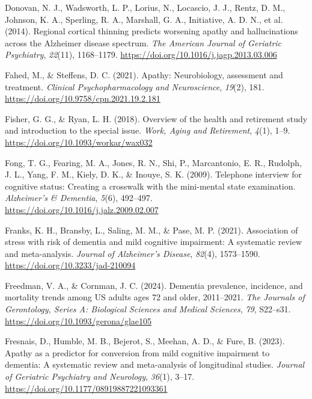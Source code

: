 \documentclass[
]{article}
\newlength{\cslhangindent}
\newenvironment{CSLReferences}[2] %
 {\begin{list}{}{%
  \setlength{\itemindent}{0pt}
  \setlength{\leftmargin}{0pt}
  \setlength{\parsep}{0pt}
  \ifodd #1
   \setlength{\leftmargin}{\cslhangindent}
   \setlength{\itemindent}{-1\cslhangindent}
  \fi
  \setlength{\itemsep}{#2\baselineskip}}}
 {\end{list}}
\begin{document}
\begin{CSLReferences}{1}{0}
Donovan, N. J., Wadsworth, L. P., Lorius, N., Locascio, J. J., Rentz, D.
M., Johnson, K. A., Sperling, R. A., Marshall, G. A., Initiative, A. D.
N., et al. (2014). Regional cortical thinning predicts worsening apathy
and hallucinations across the {Alzheimer} disease spectrum. \emph{The
American Journal of Geriatric Psychiatry}, \emph{22}(11), 1168--1179.
\url{https://doi.org/10.1016/j.jagp.2013.03.006}

Fahed, M., \& Steffens, D. C. (2021). Apathy: Neurobiology, assessment
and treatment. \emph{Clinical Psychopharmacology and Neuroscience},
\emph{19}(2), 181. \url{https://doi.org/10.9758/cpn.2021.19.2.181}

Fisher, G. G., \& Ryan, L. H. (2018). Overview of the health and
retirement study and introduction to the special issue. \emph{Work,
Aging and Retirement}, \emph{4}(1), 1--9.
\url{https://doi.org/10.1093/workar/wax032}

Fong, T. G., Fearing, M. A., Jones, R. N., Shi, P., Marcantonio, E. R.,
Rudolph, J. L., Yang, F. M., Kiely, D. K., \& Inouye, S. K. (2009).
Telephone interview for cognitive status: {Creating} a crosswalk with
the mini-mental state examination. \emph{Alzheimer's \& Dementia},
\emph{5}(6), 492--497. \url{https://doi.org/10.1016/j.jalz.2009.02.007}

Franks, K. H., Bransby, L., Saling, M. M., \& Pase, M. P. (2021).
Association of stress with risk of dementia and mild cognitive
impairment: A systematic review and meta-analysis. \emph{Journal of
Alzheimer's Disease}, \emph{82}(4), 1573--1590.
\url{https://doi.org/10.3233/jad-210094}

Freedman, V. A., \& Cornman, J. C. (2024). Dementia prevalence,
incidence, and mortality trends among {US} adults ages 72 and older,
2011--2021. \emph{The Journals of Gerontology, Series A: Biological
Sciences and Medical Sciences}, \emph{79}, S22--s31.
\url{https://doi.org/10.1093/gerona/glae105}

Fresnais, D., Humble, M. B., Bejerot, S., Meehan, A. D., \& Fure, B.
(2023). Apathy as a predictor for conversion from mild cognitive
impairment to dementia: A systematic review and meta-analysis of
longitudinal studies. \emph{Journal of Geriatric Psychiatry and
Neurology}, \emph{36}(1), 3--17.
\url{https://doi.org/10.1177/08919887221093361}


\end{CSLReferences}
\end{document}
